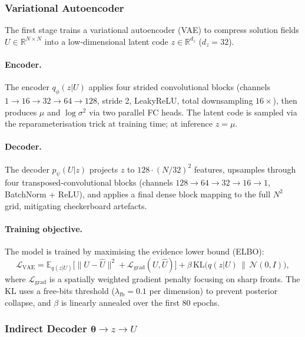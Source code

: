 \documentclass[a4paper]{article}
\newcommand{\vtheta}{\bm{\theta}}
\newcommand{\R}{\mathbb{R}}
\newcommand{\E}{\mathbb{E}}
\newcommand{\KL}{\mathrm{KL}}
\begin{document}
\subsubsection{Variational Autoencoder}

The first stage trains a variational autoencoder (VAE) \cite{kingma2013vae} to compress solution fields $U \in \R^{N \times N}$ into a low-dimensional latent code $z \in \R^{d_z}$ ($d_z = 32$).

\paragraph{Encoder.}
The encoder $q_\phi(z|U)$ applies four strided convolutional blocks (channels $1\!\to\!16\!\to\!32\!\to\!64\!\to\!128$, stride 2, LeakyReLU, total downsampling $16\times$), then produces $\mu$ and $\log\sigma^2$ via two parallel FC heads. The latent code is sampled via the reparameterisation trick at training time; at inference $z = \mu$.

\paragraph{Decoder.}
The decoder $p_\psi(U|z)$ projects $z$ to $128\cdot(N/32)^2$ features, upsamples through four transposed-convolutional blocks (channels $128\!\to\!64\!\to\!32\!\to\!16\!\to\!1$, BatchNorm + ReLU), and applies a final dense block mapping to the full $N^2$ grid, mitigating checkerboard artefacts.

\paragraph{Training objective.}
The model is trained by maximising the evidence lower bound (ELBO):
\begin{equation}
    \mathcal{L}_{\mathrm{VAE}} = \E_{q(z|U)}\bigl[\|U - \hat{U}\|^2 + \mathcal{L}_{\mathrm{grad}}(U, \hat{U})\bigr] + \beta\,\KL\bigl(q(z|U)\,\|\,\mathcal{N}(0,I)\bigr),
    \label{eq:elbo}
\end{equation}
where $\mathcal{L}_{\mathrm{grad}}$ is a spatially weighted gradient penalty focusing on sharp fronts. The KL uses a free-bits threshold ($\lambda_{\mathrm{fb}} = 0.1$ per dimension) to prevent posterior collapse, and $\beta$ is linearly annealed over the first 80 epochs.

\subsubsection{Indirect Decoder \texorpdfstring{$\vtheta \to z \to U$}{theta to z to U}}
\end{document}
